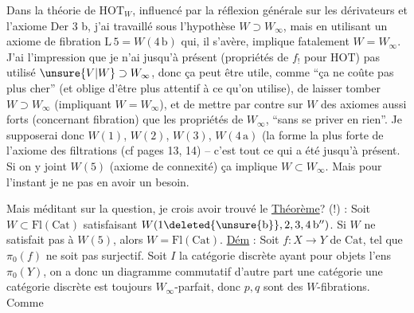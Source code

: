 
Dans la théorie de $\mathrm{HOT}_W$, influencé par la réflexion générale sur les dérivateurs et l'axiome Der 3 b, j'ai travaillé sous l'hypothèse $W\supset W_\infty$, mais en utilisant un axiome de fibration $\mathrm L\,5=W(4\,\mathrm b)$ qui, il s'avère, implique fatalement $W=W_\infty$. J'ai l'impression que je n'ai jusqu'à présent (propriétés de $f_!$ pour $\mathrm{HOT}$) pas utilisé $\unsure{V|W}\supset W_\infty$, donc ça peut être utile, comme ``ça ne coûte pas plus cher'' (et oblige d'être plus attentif à ce qu'on utilise), de laisser tomber $W\supset W_\infty$   (impliquant $W=W_\infty$), et de mettre par contre sur $W$ des axiomes aussi forts (concernant  fibration) que les propriétés de $W_\infty$, ``sans se priver en rien''. Je supposerai donc $W(1)$, $W(2)$, $W(3)$, $W(4\,\mathrm a)$ (la forme la plus forte de l'axiome des filtrations (cf pages 13, 14) -- c'est tout ce qui a été  jusqu'à présent.  Si on y joint $W(5)$ (axiome de connexité) ça implique $W\subset W_\infty$. Mais pour l'instant je ne  pas en avoir un besoin. 

Mais méditant sur la question, je crois avoir trouvé le
 \uline{Théorème}? (!) : Soit $W\subset\mathrm{Fl}(\mathrm{Cat})$ satisfaisant $W(1\deleted{\unsure{\mathrm b}},2,3,4\,\mathrm b'')$. Si $W$ ne satisfait pas à $W(5)$, alors $W=\mathrm{Fl}(\mathrm{Cat})$.
 \uline{Dém} : Soit $f:X\longrightarrow Y$ de $\mathrm{Cat}$, tel que $\pi_0(f)$ ne soit pas surjectif. Soit $I$ la catégorie discrète ayant pour objets l'ens $\pi_0(Y)$, on a donc un diagramme commutatif  d'autre part  une catégorie  une catégorie discrète est toujours $W_\infty$-parfait, donc $p,q$ sont des $W$-fibrations. Comme

